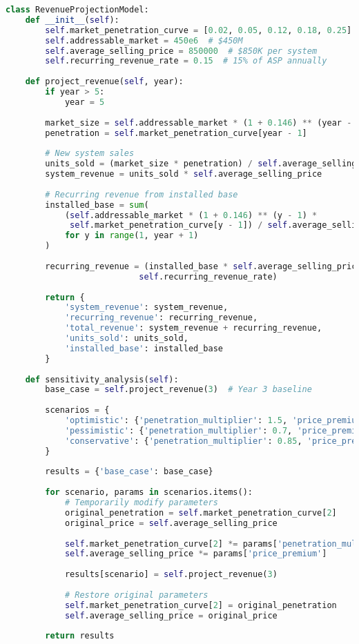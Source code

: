 \begin{lstlisting}[language=Python, caption={Revenue Projection Model}, label={lst:revenue-projection}]
class RevenueProjectionModel:
    def __init__(self):
        self.market_penetration_curve = [0.02, 0.05, 0.12, 0.18, 0.25]  # 5-year
        self.addressable_market = 450e6  # $450M
        self.average_selling_price = 850000  # $850K per system
        self.recurring_revenue_rate = 0.15  # 15% of ASP annually
        
    def project_revenue(self, year):
        if year > 5:
            year = 5
        
        market_size = self.addressable_market * (1 + 0.146) ** (year - 1)
        penetration = self.market_penetration_curve[year - 1]
        
        # New system sales
        units_sold = (market_size * penetration) / self.average_selling_price
        system_revenue = units_sold * self.average_selling_price
        
        # Recurring revenue from installed base
        installed_base = sum(
            (self.addressable_market * (1 + 0.146) ** (y - 1) * 
             self.market_penetration_curve[y - 1]) / self.average_selling_price
            for y in range(1, year + 1)
        )
        
        recurring_revenue = (installed_base * self.average_selling_price * 
                           self.recurring_revenue_rate)
        
        return {
            'system_revenue': system_revenue,
            'recurring_revenue': recurring_revenue,
            'total_revenue': system_revenue + recurring_revenue,
            'units_sold': units_sold,
            'installed_base': installed_base
        }
    
    def sensitivity_analysis(self):
        base_case = self.project_revenue(3)  # Year 3 baseline
        
        scenarios = {
            'optimistic': {'penetration_multiplier': 1.5, 'price_premium': 1.1},
            'pessimistic': {'penetration_multiplier': 0.7, 'price_premium': 0.9},
            'conservative': {'penetration_multiplier': 0.85, 'price_premium': 0.95}
        }
        
        results = {'base_case': base_case}
        
        for scenario, params in scenarios.items():
            # Temporarily modify parameters
            original_penetration = self.market_penetration_curve[2]
            original_price = self.average_selling_price
            
            self.market_penetration_curve[2] *= params['penetration_multiplier']
            self.average_selling_price *= params['price_premium']
            
            results[scenario] = self.project_revenue(3)
            
            # Restore original parameters
            self.market_penetration_curve[2] = original_penetration
            self.average_selling_price = original_price
        
        return results
\end{lstlisting}

